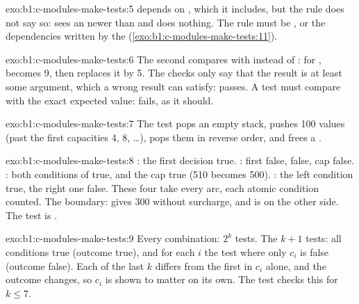 \begin{solution}{exo:b1:c-modules-make-tests:5}
 depends on , which it includes, but the rule does not say so:  sees an
 newer than  and does nothing. The rule must be , or the dependencies written by the  (\cref{exo:b1:c-modules-make-tests:11}).
\end{solution}

\begin{solution}{exo:b1:c-modules-make-tests:6}
The second  compares  with  instead of : for ,  becomes 9, then
 replaces it by 5. The checks only say that the result is at least some argument, which a wrong result
can satisfy:  passes. A test must compare with the exact expected value: 
fails, as it should.
\end{solution}

\begin{solution}{exo:b1:c-modules-make-tests:7}
The test  pops an empty stack, pushes 100 values (past the first capacities 4, 8, \dots),
pops them in reverse order, and frees a .
\end{solution}

\begin{solution}{exo:b1:c-modules-make-tests:8}
: the first decision true. : first false,  false, cap false.
: both conditions of \code{&&} true, and the cap true (510 becomes 500). : the left
condition true, the right one false. These four take every arc, each atomic condition counted. The boundary:
 gives 300 without surcharge, and  is on the other side. The test is
.
\end{solution}

\begin{solution}{exo:b1:c-modules-make-tests:9}
Every combination: $2^k$ tests. The $k + 1$ tests: all conditions true (outcome true), and for each $i$ the test where
only $c_i$ is false (outcome false). Each of the last $k$ differs from the first in $c_i$ alone, and the outcome
changes, so $c_i$ is shown to matter on its own. The test  checks this for $k \leq 7$.
\end{solution}

